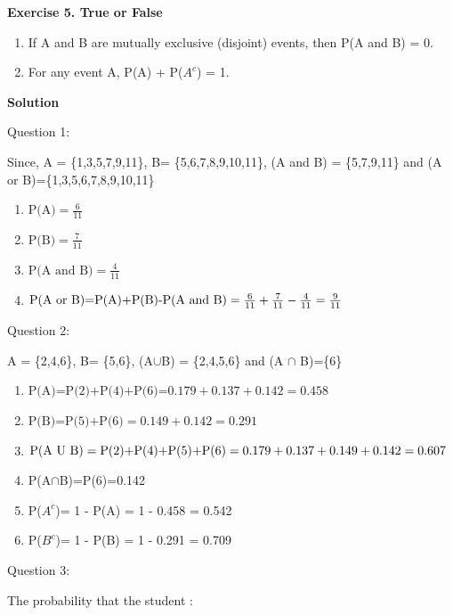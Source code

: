 \documentclass[
]{book}
\begin{document}
\textbf{Exercise 5. True or False}

\begin{enumerate}
\def\labelenumi{\alph{enumi})}
\item
  If A and B are mutually exclusive (disjoint) events, then P(A and B) = 0.
\item
  For any event A, P(A) + P(\(A^c\)) = 1.
\end{enumerate}

\textbf{Solution}

Question 1:

Since, A = \{1,3,5,7,9,11\}, B= \{5,6,7,8,9,10,11\}, (A and B) = \{5,7,9,11\} and (A or B)=\{1,3,5,6,7,8,9,10,11\}

\begin{enumerate}
\def\labelenumi{\alph{enumi})}
\item
  \(\text{P(A)}=\frac{6}{11}\)
\item
  \(\text{P(B)}=\frac{7}{11}\)
\item
  \(\text{P(A and B)}=\frac{4}{11}\)
\item
  \(\text{P(A or B)=P(A)+P(B)-P(A and B)}\\=\frac{6}{11}+\frac{7}{11}-\frac{4}{11}=\frac{9}{11}\)
\end{enumerate}

Question 2:

A = \{2,4,6\}, B= \{5,6\}, (A\(\cup\)B) = \{2,4,5,6\} and (A \(\cap\) B)=\{6\}

\begin{enumerate}
\def\labelenumi{\alph{enumi})}
\item
  \(\text{P(A)=P(2)+P(4)+P(6)=}0.179+0.137+0.142=0.458\)
\item
  \(\text{P(B)=P(5)+P(6)}=0.149+0.142=0.291\)
\item
  \(\text{P(A U B)}=\text{P(2)+P(4)+P(5)+P(6)}=0.179+0.137+0.149+0.142 \\=0.607\)
\item
  P(A\(\cap\)B)=P(6)=0.142
\item
  P(\(A^c\))= 1 - P(A) = 1 - 0.458 = 0.542
\item
  P(\(B^c\))= 1 - P(B) = 1 - 0.291 = 0.709
\end{enumerate}

Question 3:

The probability that the student :
\end{document}
